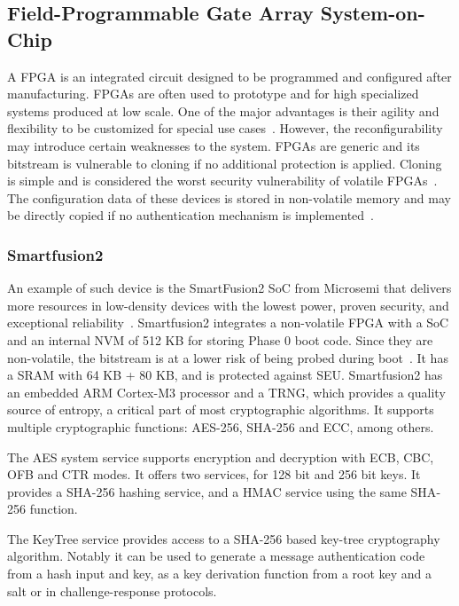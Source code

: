 \subsection{Field-Programmable Gate Array System-on-Chip}\label{chap:background:computing:smartfusion}
A \ac{FPGA} is an integrated circuit designed to be programmed and configured after manufacturing. \ac{FPGA}s are often used to prototype and for high specialized systems produced at low scale. One of the major advantages is their agility and flexibility to be customized for special use cases~\cite{cyberphysicalsystems}. However, the reconfigurability may introduce certain weaknesses to the system. \ac{FPGA}s are generic and its bitstream is vulnerable to cloning if no additional protection is applied. Cloning is simple and is considered the worst security vulnerability of volatile \ac{FPGA}s~\cite{fpgasurvey}. The configuration data of these devices is stored in non-volatile memory and may be directly copied if no authentication mechanism is implemented~\cite{drimer2007authentication}.

\subsubsection*{Smartfusion2}%
An example of such device is the SmartFusion2 \ac{SoC} from Microsemi that delivers more resources in low-density devices with the lowest power, proven security, and exceptional reliability~\cite{smartfusion2soc}. Smartfusion2 integrates a non-volatile \ac{FPGA} with a \ac{SoC} and an internal \ac{NVM} of 512 KB for storing Phase 0 boot code.
Since they are non-volatile, the bitstream is at a lower risk of being probed during boot~\cite{parrinha2017flexible}. It has a \ac{SRAM} with 64 KB + 80 KB, and is protected against \ac{SEU}. Smartfusion2 has an embedded ARM Cortex-M3 processor and a \ac{TRNG}, which provides a quality source of entropy, a critical part of most cryptographic algorithms. It supports multiple cryptographic functions: \ac{AES}-256, \ac{SHA}-256 and \ac{ECC}, among others.

The \ac{AES} system service supports encryption and decryption with ECB, CBC, OFB and CTR modes. It offers two services, for 128 bit and 256 bit keys.
It provides a \ac{SHA}-256 hashing service, and a \ac{HMAC} service using the same \ac{SHA}-256 function.

The KeyTree service provides access to a SHA-256 based key-tree cryptography algorithm. Notably it can be used to generate a message authentication code from a hash input and key, as a key derivation function from a root key and a salt or in challenge-response protocols.

